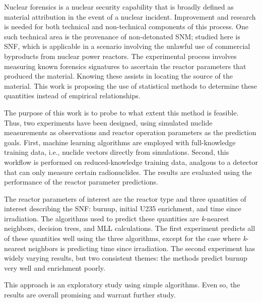 Nuclear forensics is a nuclear security capability that is broadly defined as
material attribution in the event of a nuclear incident.  Improvement and
research is needed for both technical and non-technical components of this
process.  One such technical area is the provenance of non-detonated \gls{SNM};
studied here is \gls{SNF}, which is applicable in a scenario involving the
unlawful use of commercial byproducts from nuclear power reactors.  The
experimental process involves measuring known forensics signatures to ascertain
the reactor parameters that produced the material. Knowing these assists in
locating the source of the material. This work is proposing the use of
statistical methods to determine these quantities instead of empirical
relationships. 

The purpose of this work is to probe to what extent this method is feasible.
Thus, two experiments have been designed, using simulated nuclide measurements
as observations and reactor operation parameters as the prediction goals.
First, machine learning algorithms are employed with full-knowledge training
data, i.e., nuclide vectors directly from simulations.  Second, this workflow
is performed on reduced-knowledge training data, analgous to a detector that
can only measure certain radionuclides. The results are evaluated using the
performance of the reactor parameter predictions.

The reactor parameters of interest are the reactor type and three quantities of
interest describing the \gls{SNF}: burnup, initial U235 enrichment, and time
since irradiation. The algorithms used to predict these quantities are
\textit{k}-nearest neighbors, decision trees, and \gls{MLL} calculations. The
first experiment predicts all of these quantities well using the three
algorithms, except for the case where \textit{k}-nearest neighbors is
predicting time since irradiation. The second experiment has widely varying
results, but two consistent themes: the methods predict burnup very well and
enrichment poorly.

This approach is an exploratory study using simple algorithms. Even so, the
results are overall promising and warrant further study.


